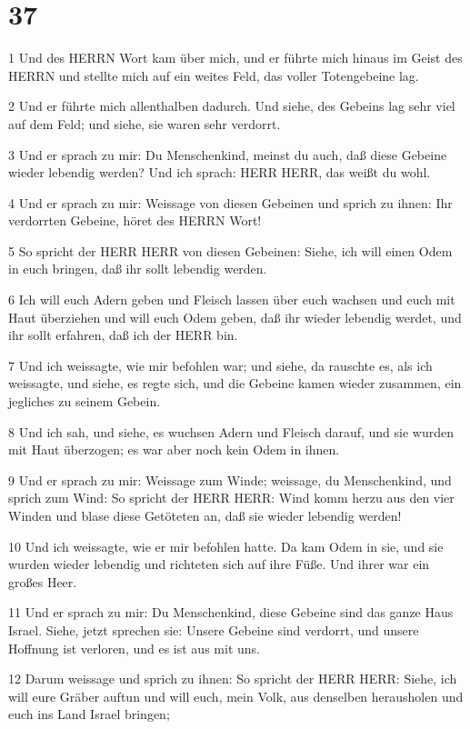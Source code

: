 \chapter{37}

\par 1 Und des HERRN Wort kam über mich, und er führte mich hinaus im Geist des HERRN und stellte mich auf ein weites Feld, das voller Totengebeine lag.
\par 2 Und er führte mich allenthalben dadurch. Und siehe, des Gebeins lag sehr viel auf dem Feld; und siehe, sie waren sehr verdorrt.
\par 3 Und er sprach zu mir: Du Menschenkind, meinst du auch, daß diese Gebeine wieder lebendig werden? Und ich sprach: HERR HERR, das weißt du wohl.
\par 4 Und er sprach zu mir: Weissage von diesen Gebeinen und sprich zu ihnen: Ihr verdorrten Gebeine, höret des HERRN Wort!
\par 5 So spricht der HERR HERR von diesen Gebeinen: Siehe, ich will einen Odem in euch bringen, daß ihr sollt lebendig werden.
\par 6 Ich will euch Adern geben und Fleisch lassen über euch wachsen und euch mit Haut überziehen und will euch Odem geben, daß ihr wieder lebendig werdet, und ihr sollt erfahren, daß ich der HERR bin.
\par 7 Und ich weissagte, wie mir befohlen war; und siehe, da rauschte es, als ich weissagte, und siehe, es regte sich, und die Gebeine kamen wieder zusammen, ein jegliches zu seinem Gebein.
\par 8 Und ich sah, und siehe, es wuchsen Adern und Fleisch darauf, und sie wurden mit Haut überzogen; es war aber noch kein Odem in ihnen.
\par 9 Und er sprach zu mir: Weissage zum Winde; weissage, du Menschenkind, und sprich zum Wind: So spricht der HERR HERR: Wind komm herzu aus den vier Winden und blase diese Getöteten an, daß sie wieder lebendig werden!
\par 10 Und ich weissagte, wie er mir befohlen hatte. Da kam Odem in sie, und sie wurden wieder lebendig und richteten sich auf ihre Füße. Und ihrer war ein großes Heer.
\par 11 Und er sprach zu mir: Du Menschenkind, diese Gebeine sind das ganze Haus Israel. Siehe, jetzt sprechen sie: Unsere Gebeine sind verdorrt, und unsere Hoffnung ist verloren, und es ist aus mit uns.
\par 12 Darum weissage und sprich zu ihnen: So spricht der HERR HERR: Siehe, ich will eure Gräber auftun und will euch, mein Volk, aus denselben herausholen und euch ins Land Israel bringen;
